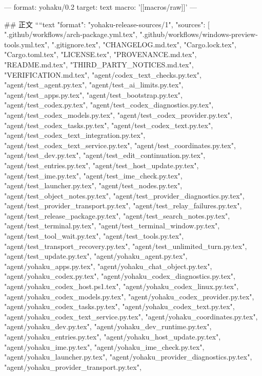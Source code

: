 ---
format: yohaku/0.2
target: text
macro: '[[macros/raw]]'
---

## 正文
````text
{
  "format": "yohaku-release-sources/1",
  "sources": [
    ".github/workflows/arch-package.yml.tex",
    ".github/workflows/windows-preview-tools.yml.tex",
    ".gitignore.tex",
    "CHANGELOG.md.tex",
    "Cargo.lock.tex",
    "Cargo.toml.tex",
    "LICENSE.tex",
    "PROVENANCE.md.tex",
    "README.md.tex",
    "THIRD_PARTY_NOTICES.md.tex",
    "VERIFICATION.md.tex",
    "agent/codex_text_checks.py.tex",
    "agent/test_agent.py.tex",
    "agent/test_ai_limits.py.tex",
    "agent/test_apps.py.tex",
    "agent/test_bootstrap.py.tex",
    "agent/test_codex.py.tex",
    "agent/test_codex_diagnostics.py.tex",
    "agent/test_codex_models.py.tex",
    "agent/test_codex_provider.py.tex",
    "agent/test_codex_tasks.py.tex",
    "agent/test_codex_text.py.tex",
    "agent/test_codex_text_integration.py.tex",
    "agent/test_codex_text_service.py.tex",
    "agent/test_coordinates.py.tex",
    "agent/test_dev.py.tex",
    "agent/test_edit_continuation.py.tex",
    "agent/test_entries.py.tex",
    "agent/test_host_update.py.tex",
    "agent/test_ime.py.tex",
    "agent/test_ime_check.py.tex",
    "agent/test_launcher.py.tex",
    "agent/test_nodes.py.tex",
    "agent/test_object_notes.py.tex",
    "agent/test_provider_diagnostics.py.tex",
    "agent/test_provider_transport.py.tex",
    "agent/test_relay_failures.py.tex",
    "agent/test_release_package.py.tex",
    "agent/test_search_notes.py.tex",
    "agent/test_terminal.py.tex",
    "agent/test_terminal_window.py.tex",
    "agent/test_tool_wait.py.tex",
    "agent/test_tools.py.tex",
    "agent/test_transport_recovery.py.tex",
    "agent/test_unlimited_turn.py.tex",
    "agent/test_update.py.tex",
    "agent/yohaku_agent.py.tex",
    "agent/yohaku_apps.py.tex",
    "agent/yohaku_chat_object.py.tex",
    "agent/yohaku_codex.py.tex",
    "agent/yohaku_codex_diagnostics.py.tex",
    "agent/yohaku_codex_host.ps1.tex",
    "agent/yohaku_codex_linux.py.tex",
    "agent/yohaku_codex_models.py.tex",
    "agent/yohaku_codex_provider.py.tex",
    "agent/yohaku_codex_tasks.py.tex",
    "agent/yohaku_codex_text.py.tex",
    "agent/yohaku_codex_text_service.py.tex",
    "agent/yohaku_coordinates.py.tex",
    "agent/yohaku_dev.py.tex",
    "agent/yohaku_dev_runtime.py.tex",
    "agent/yohaku_entries.py.tex",
    "agent/yohaku_host_update.py.tex",
    "agent/yohaku_ime.py.tex",
    "agent/yohaku_ime_check.py.tex",
    "agent/yohaku_launcher.py.tex",
    "agent/yohaku_provider_diagnostics.py.tex",
    "agent/yohaku_provider_transport.py.tex",
}
